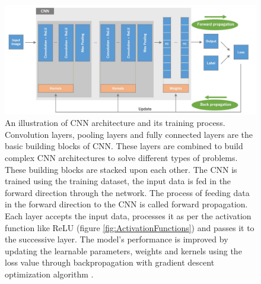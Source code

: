 \vspace*{0.3cm}
\begin{figure}[H]
        \begin{center}
	    \includegraphics[scale=0.59]{images/Fundamentals/CNNBuildingBlocks.JPG}
	    \caption[An illustration of \ac{CNN} architecture and its training process.]{An illustration of \ac{CNN} architecture and its training process. Convolution layers, pooling layers and fully connected layers are the basic building blocks of \ac{CNN}. These layers are combined to build complex \ac{CNN} architectures to solve different types of problems. These building blocks are stacked upon each other. The \ac{CNN} is trained using the training dataset, the input data is fed in the forward direction through the network. The process of feeding data in the forward direction to the \ac{CNN} is called forward propagation. Each layer accepts the input data, processes it as per the activation function like \ac{ReLU} (figure \ref{fig:ActivationFunctions}) and passes it to the successive layer. The model's performance is improved by updating the learnable parameters, weights and kernels using the loss value through backpropagation with gradient descent optimization algorithm \cite{ruder2017overview} \cite{articleCNNs}.}
	    \label{fig:CNNBuildingBlocks}
	    \end{center}
\end{figure}





